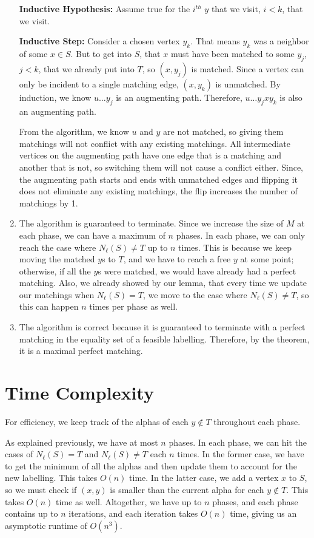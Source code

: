 \documentclass[12pt]{article}
\begin{document}
\begin{enumerate}
  \textbf{Inductive Hypothesis: } Assume true for the $i^{th}$ $y$ that we visit, $i < k$, that we visit.

  \textbf{Inductive Step: } Consider a chosen vertex $y_k$. That means $y_k$ was a neighbor of some $x \in S$. But to get into $S$, that $x$ must have been matched to some $y_j$, $j < k$, that we already put into $T$, so $(x, y_j)$ is matched. Since a vertex can only be incident to a single matching edge, $(x, y_k)$ is unmatched. By induction, we know $u\ldots y_j$ is an augmenting path. Therefore, $u\ldots y_jxy_k$ is also an augmenting path.

  From the algorithm, we know $u$ and $y$ are not matched, so giving them matchings will not conflict with any existing matchings. All intermediate vertices on the augmenting path have one edge that is a matching and another that is not, so switching them will not cause a conflict either. Since, the augmenting path starts and ends with unmatched edges and flipping it does not eliminate any existing matchings, the flip increases the number of matchings by 1.


  \item The algorithm is guaranteed to terminate. Since we increase the size of $M$ at each phase, we can have a maximum of $n$ phases. In each phase, we can only reach the case where $N_\ell(S) \neq T$ up to $n$ times. This is because we keep moving the matched $y$s to $T$, and we have to reach a free $y$ at some point; otherwise, if all the $y$s were matched, we would have already had a perfect matching. Also, we already showed by our lemma, that every time we update our matchings when $N_\ell(S) = T$, we move to the case where $N_\ell(S) \neq T$, so this can happen $n$ times per phase as well.

\item The algorithm is correct because it is guaranteed to terminate with a perfect matching in the equality set of a feasible labelling. Therefore, by the theorem, it is a maximal perfect matching.
\end{enumerate}


\section*{Time Complexity}

For efficiency, we keep track of the alphas of each $y \notin T$ throughout each phase.

As explained previously, we have at most $n$ phases. In each phase, we can hit the cases of $N_\ell(S) = T$ and $N_\ell(S) \neq T$ each $n$ times. In the former case, we have to get the minimum of all the alphas and then update them to account for the new labelling. This takes $O(n)$ time. In the latter case, we add a vertex $x$ to $S$, so we must check if $(x, y)$ is smaller than the current alpha for each $y \notin T$. This takes $O(n)$ time as well. Altogether, we have up to $n$ phases, and each phase contains up to $n$ iterations, and each iteration takes $O(n)$ time, giving us an asymptotic runtime of $O(n^3)$.
\end{document}
